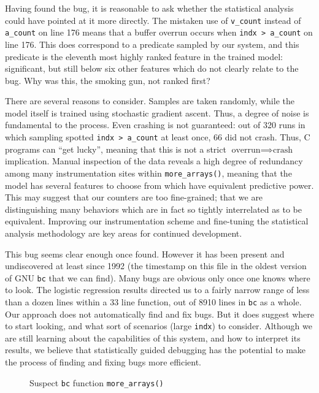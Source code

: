 Having found the bug, it is reasonable to ask whether the statistical
analysis could have pointed at it more directly.  The mistaken use of
\texttt{v\_count} instead of \texttt{a\_count} on line 176 means that
a buffer overrun occurs when \texttt{indx > a\_count} on line 176.
This does correspond to a predicate sampled by our system, and this
predicate is the eleventh most highly ranked feature in the trained
model: significant, but still below six other features which do not
clearly relate to the bug.  Why was this, the smoking gun, not ranked
first?

There are several reasons to consider.  Samples are taken randomly,
while the model itself is trained using stochastic gradient ascent.
Thus, a degree of noise is fundamental to the process.  Even crashing
is not guaranteed: out of 320 runs in which sampling spotted
\texttt{indx > a\_count} at least once, 66 did not crash.  Thus, C
programs can ``get lucky'', meaning that this is not a strict
$\text{overrun} \implies \text{crash}$ implication.  Manual inspection
of the data reveals a high degree of redundancy among many
instrumentation sites within \texttt{more\_arrays()}, meaning that the
model has several features to choose from which have equivalent
predictive power.  This may suggest that our counters are too
fine-grained; that we are distinguishing many behaviors which are in
fact so tightly interrelated as to be equivalent.  Improving our
instrumentation scheme and fine-tuning the statistical analysis
methodology are key areas for continued development.

This bug seems clear enough once found.  However it has been present
and undiscovered at least since 1992 (the time\-stamp on this file in
the oldest version of GNU \texttt{bc} that we can find).  Many bugs
are obvious only once one knows where to look.  The logistic
regression results directed us to a fairly narrow range of less than a
dozen lines within a 33 line function, out of 8910 lines in
\texttt{bc} as a whole.  Our approach does not automatically find and
fix bugs.  But it does suggest where to start looking, and what sort
of scenarios (large \texttt{indx}) to consider.  Although we are still
learning about the capabilities of this system, and how to interpret
its results, we believe that statistically guided debugging has the
potential to make the process of finding and fixing bugs more
efficient.

\begin{figure}
  \centering
  \small
  \caption{Suspect \texttt{bc} function \texttt{more\_arrays()}}
  \label{fig:bc:more-arrays}
\end{figure}
